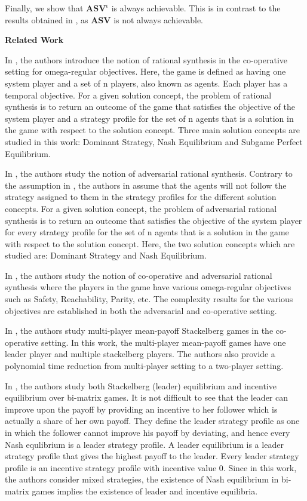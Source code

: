 Finally, we show that $\mathbf{ASV}^{\epsilon}$ is always achievable. This is in contrast to the results obtained in \cite{FGR20}, as $\mathbf{ASV}$ is not always achievable.

\textbf{Related Work}

In \cite{FKL10}, the authors introduce the notion of rational synthesis in the co-operative setting for omega-regular objectives. Here, the game is defined as having one system player and a set of n players, also known as agents. Each player has a temporal objective. For a given solution concept, the problem of rational synthesis is to return an outcome of the game that satisfies the objective of the system player and a strategy profile for the set of n agents that is a solution in the game with respect to the solution concept. Three main solution concepts are studied in this work: Dominant Strategy, Nash Equilibrium and Subgame Perfect Equilibrium. 

In \cite{KPV16}, the authors study the notion of adversarial rational synthesis. Contrary to the assumption in \cite{FKL10}, the authors in \cite{KPV16} assume that the agents will not follow the strategy assigned to them in the strategy profiles for the different solution concepts. For a given solution concept, the problem of adversarial rational synthesis is to return an outcome that satisfies the objective of the system player for every strategy profile for the set of n agents that is a solution in the game with respect to the solution concept. Here, the two solution concepts which are studied are: Dominant Strategy and Nash Equilibrium.

In \cite{CFGR16}, the authors study the notion of co-operative and adversarial rational synthesis where the players in the game have various omega-regular objectives such as Safety, Reachability, Parity, etc. The complexity results for the various objectives are established in both the adversarial and co-operative setting. 

In \cite{GS14}, the authors study multi-player mean-payoff Stackelberg games in the co-operative setting. In this work, the multi-player mean-payoff games have one leader player and multiple stackelberg players. The authors also provide a polynomial time reduction from multi-player setting to a two-player setting.

In \cite{GS18}, the authors study both Stackelberg (leader) equilibrium and incentive equilibrium over bi-matrix games. It is not difficult to see that the leader can improve upon the payoff by providing an incentive to her follower which is actually a share of her own payoff. They define the leader strategy profile as one in which the follower cannot improve his payoff by deviating, and hence every Nash equlibrium is a leader strategy profile. A leader equilibrium is a leader strategy profile that gives the highest payoff to the leader. Every leader strategy profile is an incentive strategy profile with incentive value $0$. Since in this work, the authors consider mixed strategies, the existence of Nash equilibrium in bi-matrix games \cite{Nash50,LH64} implies the existence of leader and incentive equilibria.

